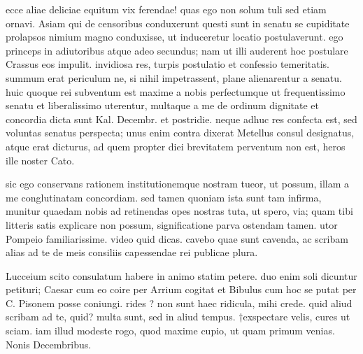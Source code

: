  ecce aliae deliciae equitum vix ferendae! quas ego non solum tuli sed etiam ornavi. Asiam qui de censoribus conduxerunt questi sunt in senatu se cupiditate prolapsos nimium magno conduxisse, ut induceretur locatio postulaverunt. ego princeps in adiutoribus atque adeo secundus; nam ut illi auderent hoc postulare Crassus eos impulit. invidiosa res, turpis postulatio et confessio temeritatis. summum erat periculum ne, si nihil impetrassent, plane alienarentur a senatu. huic quoque rei subventum est maxime a nobis perfectumque ut frequentissimo senatu et liberalissimo uterentur, multaque a me de ordinum dignitate et concordia dicta sunt Kal. Decembr. et postridie. neque adhuc res confecta est, sed voluntas senatus perspecta; unus enim contra dixerat Metellus consul designatus, atque erat dicturus, ad quem propter diei brevitatem perventum non est, heros ille noster Cato.

 sic ego conservans rationem institutionemque nostram tueor, ut possum, illam a me conglutinatam concordiam. sed tamen quoniam ista sunt tam infirma, munitur quaedam nobis ad retinendas opes nostras tuta, ut spero, via; quam tibi litteris satis explicare non possum, significatione parva ostendam tamen. utor Pompeio familiarissime. video quid dicas. cavebo quae sunt cavenda, ac scribam alias ad te de meis consiliis capessendae rei publicae plura.

 Lucceium scito consulatum habere in animo statim petere. duo enim soli dicuntur petituri; Caesar cum eo coire per Arrium cogitat et Bibulus cum hoc se putat per C. Pisonem posse coniungi. rides ? non sunt haec ridicula, mihi crede. quid aliud scribam ad te, quid? multa sunt, sed in aliud tempus. †exspectare velis, cures ut sciam. iam illud modeste rogo, quod maxime cupio, ut quam primum venias. Nonis Decembribus.
